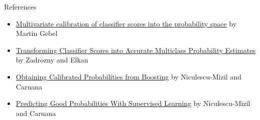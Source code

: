 \documentclass[ignorenonframetext,]{beamer}
\begin{document}
\begin{frame}{References}

\begin{itemize}
\item
  \href{https://www.researchgate.net/publication/28358301_Multivariate_calibration_of_classifier_scores_into_the_probability_space}{Multivariate
  calibration of classifier scores into the probability space} by Martin
  Gebel
\item
  \href{https://www.google.com/url?sa=t\&rct=j\&q=\&esrc=s\&source=web\&cd=4\&cad=rja\&uact=8\&ved=0ahUKEwit7-7h9f7UAhVl6IMKHUPeB2oQFghDMAM\&url=http\%3A\%2F\%2Fwww.cs.cornell.edu\%2Fcourses\%2Fcs678\%2F2007sp\%2FZadroznyElkan.pdf\&usg=AFQjCNEsN8dbe1yXCm7D7qkyrP6HZ6yOxg}{Transforming
  Classifier Scores into Accurate Multiclass Probability Estimates} by
  Zadrozny and Elkan
\item
  \href{http://www.cs.cornell.edu/~caruana/niculescu.scldbst.crc.rev4.pdf}{Obtaining
  Calibrated Probabilities from Boosting} by Niculescu-Mizil and Caruana
\item
  \href{https://www.google.com/url?url=http://scholar.google.com/scholar_url\%3Furl\%3Dhttp://machinelearning.wustl.edu/mlpapers/paper_files/icml2005_Niculescu-MizilC05.pdf\%26hl\%3Den\%26sa\%3DX\%26scisig\%3DAAGBfm1wOIFZHQSONJ4oLiHQyqALiSVCng\%26nossl\%3D1\%26oi\%3Dscholarr\&rct=j\&q=\&esrc=s\&sa=X\&ved=0ahUKEwiOotzS9v7UAhXr8YMKHZI8CGsQgAMIJygAMAA\&usg=AFQjCNG3rc7DzDTTox-DD_xm9hwrC5VVQA}{Predicting
  Good Probabilities With Supervised Learning} by Niculescu-Mizil and
  Caruana
\end{itemize}

\end{frame}
\end{document}
